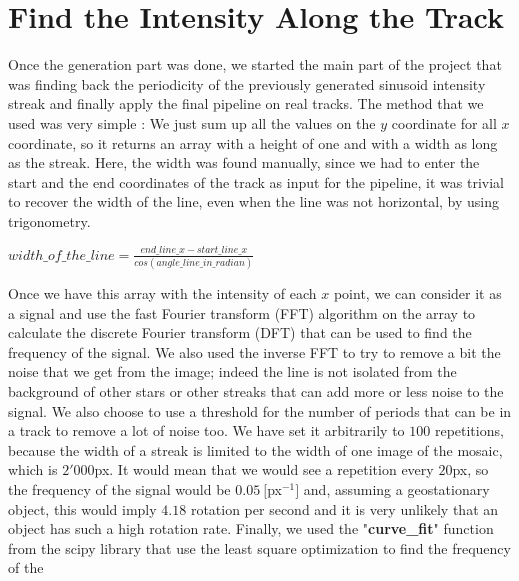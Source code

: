 \documentclass[a4paper,12pt,oneside]{report}
\begin{document}
\chapter{Find the Intensity Along the Track}
\label{findIntensityChapter}


Once the generation part was done, we started the main part of the project that was finding back the periodicity of the previously generated sinusoid 
intensity streak and finally apply the final pipeline on real tracks.
\newline
\newline
The method that we used was very simple : We just sum up all the values on the $y$ coordinate for all $x$ coordinate, so it returns an array 
with a height of one and with a width as long as the streak. Here, the width was found manually, since we had to enter the start and the end coordinates 
of the track as input for the pipeline, it was trivial to recover the width of the line, even when the line was not horizontal, by using trigonometry. 
\begin{center}
    $ \displaystyle width\_of\_the\_line = \frac{end\_line\_x - start\_line\_x}{cos(angle\_line\_in\_radian)}$
\end{center}
Once we have this array with the intensity of each $x$ point, we can consider it as a signal and use the fast Fourier transform (FFT) algorithm \cite{fastFourierTransform} 
on the array to calculate the discrete Fourier transform (DFT) that can be used to find the frequency of the signal. We also used the inverse FFT
to try to remove a bit the noise that we get from the image; indeed the line is not isolated from the background of other stars or other streaks 
that can add more or less noise to the signal. We also choose to use a threshold for the number of periods that can be in a track to remove a lot of noise too. 
We have set it arbitrarily to $100$ repetitions, because the width of a streak is limited to the width of one image of the mosaic, which is 
$2'000$px. It would mean that we would see a repetition every $20$px, so the frequency of the signal would be $0.05\ [$px$^{-1}]$ and,
assuming a geostationary object, this would imply $4.18$ rotation per second and it is very unlikely that an object has such a high 
rotation rate.
\newline
\newline
Finally, we used the "\textbf{curve\_fit}" function from the scipy library that use the least square optimization to find the frequency of the
\end{document}
